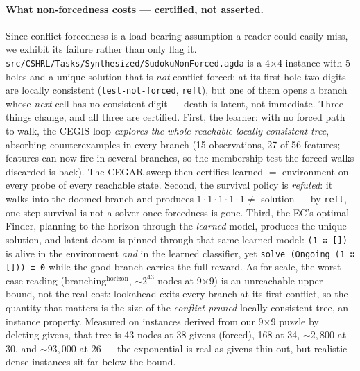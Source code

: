 \documentclass[9pt,a4paper]{article}
\newcommand{\fpath}[1]{\nolinkurl{#1}}
\theoremstyle{plain}
\theoremstyle{definition}
\theoremstyle{remark}
\begin{document}
\paragraph{What non-forcedness costs --- certified, not asserted.}  Since conflict-forcedness is a load-bearing assumption a reader could easily miss, we exhibit its failure rather than only flag it.  \fpath{src/CSHRL/Tasks/Synthesized/SudokuNonForced.agda} is a 4$\times$4 instance with 5 holes and a unique solution that is \emph{not} conflict-forced: at its first hole two digits are locally consistent (\texttt{test-not-forced}, \texttt{refl}), but one of them opens a branch whose \emph{next} cell has no consistent digit --- death is latent, not immediate.  Three things change, and all three are certified.  First, the learner: with no forced path to walk, the CEGIS loop \emph{explores the whole reachable locally-consistent tree}, absorbing counterexamples in every branch (15 observations, 27 of 56 features; features can now fire in several branches, so the membership test the forced walks discarded is back).  The CEGAR sweep then certifies learned $=$ environment on every probe of every reachable state.  Second, the survival policy is \emph{refuted}: it walks into the doomed branch and produces $1{\cdot}1{\cdot}1{\cdot}1{\cdot}1 \neq$ solution --- by \texttt{refl}, one-step survival is not a solver once forcedness is gone.  Third, the EC's optimal Finder, planning to the horizon through the \emph{learned} model, produces the unique solution, and latent doom is pinned through that same learned model: \texttt{(1 ∷ [])} is alive in the environment \emph{and} in the learned classifier, yet \texttt{solve (Ongoing (1 ∷ [])) ≡ 0} while the good branch carries the full reward.  As for scale, the worst-case reading (branching$^{\text{horizon}}$, ${\sim}2^{43}$ nodes at 9$\times$9) is an unreachable upper bound, not the real cost: lookahead exits every branch at its first conflict, so the quantity that matters is the size of the \emph{conflict-pruned} locally consistent tree, an instance property.  Measured on instances derived from our 9$\times$9 puzzle by deleting givens, that tree is 43 nodes at 38 givens (forced), 168 at 34, ${\sim}2{,}800$ at 30, and ${\sim}93{,}000$ at 26 --- the exponential is real as givens thin out, but realistic dense instances sit far below the bound.
\end{document}
